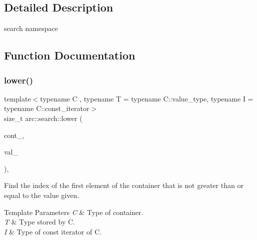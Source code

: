 \subsection{Detailed Description}
search namespace 

\subsection{Function Documentation}
\mbox{\label{namespacearc_1_1search_ab5171637f0c917d6f387cb619a319ab5}} 
\subsubsection{\texorpdfstring{lower()}{lower()}}
{\footnotesize\ttfamily template$<$typename C , typename T  = typename C\+::value\+\_\+type, typename I  = typename C\+::const\+\_\+iterator$>$ \\
size\+\_\+t arc\+::search\+::lower (\begin{DoxyParamCaption}\item[{const C \&}]{cont\+\_\+,  }\item[{const T \&}]{val\+\_\+ }\end{DoxyParamCaption})\hspace{0.3cm}{\ttfamily [inline]}, {\ttfamily [noexcept]}}

Find the index of the first element of the container that is not greater than or equal to the value given.


\begin{DoxyTemplParams}{Template Parameters}
{\em C} & Type of container. \\
\hline
{\em T} & Type stored by C. \\
\hline
{\em I} & Type of const iterator of C.\\
\hline
\end{DoxyTemplParams}

